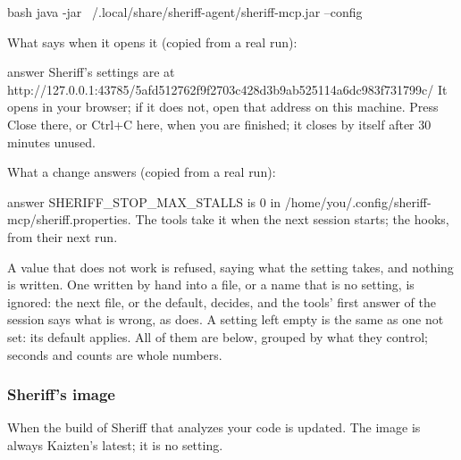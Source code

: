 \documentclass[11pt,a4paper]{article}
\begin{document}
\begin{command}{bash}
java -jar ~/.local/share/sheriff-agent/sheriff-mcp.jar --config
\end{command}

What  says when it opens it (copied from a real run):

\begin{command}[basicstyle=\ttfamily\footnotesize]{answer}
Sheriff's settings are at http://127.0.0.1:43785/5afd512762f9f2703c428d3b9ab525114a6dc983f731799c/
It opens in your browser; if it does not, open that address on this machine. Press Close
there, or Ctrl+C here, when you are finished; it closes by itself after 30 minutes unused.
\end{command}

What a change answers (copied from a real run):

\begin{command}[basicstyle=\ttfamily\footnotesize]{answer}
SHERIFF_STOP_MAX_STALLS is 0 in /home/you/.config/sheriff-mcp/sheriff.properties.
The tools take it when the next session starts; the hooks, from their next run.
\end{command}

A value that does not work is refused, saying what the setting takes, and
nothing is written. One written by hand into a file, or a name that is no
setting, is ignored: the next file, or the default, decides, and the tools'
first answer of the session says what is wrong, as  does. A
setting left empty is the same as one not set: its
default applies. All of them are below, grouped by what they control; seconds
and counts are whole numbers.

\subsubsection*{Sheriff's image} When the build of Sheriff that analyzes your
code is updated. The image is always Kaizten's latest; it is no setting.

\end{document}
